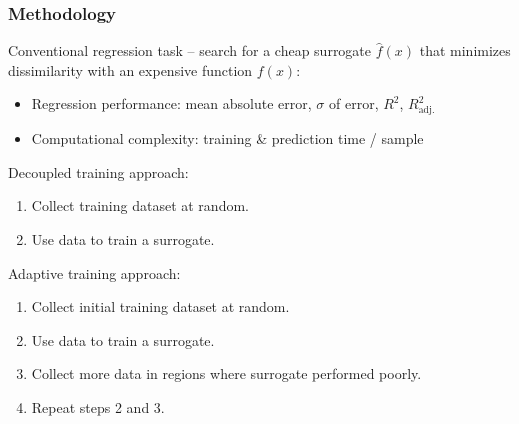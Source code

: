 \begin{frame}
	\frametitle{Methodology}
		Conventional regression task -- search for a cheap surrogate $\hat{f}(x)$ that
		\alert{minimizes dissimilarity} with an expensive function $f(x)$:

		\begin{itemize}
			\item
				Regression performance: mean absolute error, $\sigma$ of
				error, $R^2$, $R^2_\text{adj.}$
			\item
				Computational complexity:
				training \& prediction time / sample
		\end{itemize}

		\vspace{1.5em}

		Decoupled training approach:
		\begin{enumerate}
			\item Collect training dataset at random.
			\item Use data to train a surrogate.
		\end{enumerate}

		\vspace{1.5em}

		Adaptive training approach:
		\begin{enumerate}
			\item Collect initial training dataset at random.
			\item Use data to train a surrogate.
			\item Collect more data in regions where surrogate performed poorly.
			\item Repeat steps 2 and 3.
		\end{enumerate}
\end{frame}

